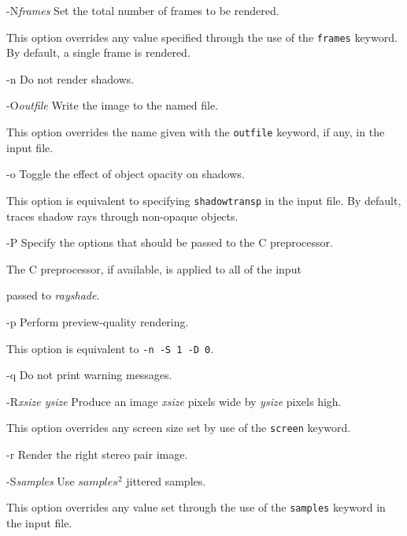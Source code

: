 \begin{defkey}{-N}{{\em frames}}
	Set the total number of frames to be rendered.
\end{defkey}
This option overrides any value specified through the use of the
{\tt frames} keyword.  By default, a single frame is rendered.

\begin{defkey}{-n}{}
	Do not render shadows.
\end{defkey}

\begin{defkey}{-O}{{\em outfile}}
	Write the image to the named file.
\end{defkey}
This option overrides the name given with the {\tt outfile} keyword,
if any,
in the input file.

\begin{defkey}{-o}{}
	Toggle the effect of object opacity on shadows.
\end{defkey}
This option is equivalent to specifying {\tt shadowtransp}
in the input file.  By default, \rayshade traces shadow
rays through non-opaque objects.

\begin{defkey}{-P}{}
	Specify the options that should be passed to the C
	preprocessor.
\end{defkey}
The C preprocessor, if available, is applied to all of the input

passed to {\em rayshade}.
\begin{defkey}{-p}{}
	Perform preview-quality rendering.
\end{defkey}
This option is equivalent to {\tt -n -S 1 -D 0}.

\begin{defkey}{-q}{}
	Do not print warning messages.
\end{defkey}

\begin{defkey}{-R}{{\em xsize ysize}}
	Produce an image {\em xsize} pixels wide by
	{\em ysize} pixels high.
\end{defkey}
This option overrides any screen size set by use of
the {\tt screen} keyword.

\begin{defkey}{-r}{}
	Render the right stereo pair image.
\end{defkey}

\begin{defkey}{-S}{{\em samples}}
	Use $samples^2$ jittered samples.
\end{defkey}
This option overrides any value set through the use of
the {\tt samples} keyword in the input file.

